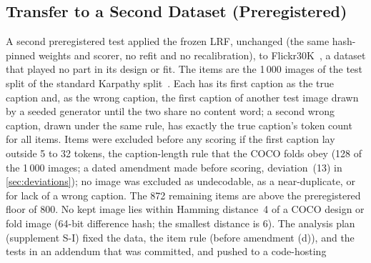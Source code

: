 \subsection{Transfer to a Second Dataset (Preregistered)}\label{sec:study2-f30k}
A second preregistered test applied the frozen LRF, unchanged (the same hash-pinned weights and scorer, no refit and no recalibration), to
Flickr30K~\cite{young2014flickr30k}, a dataset that played no part in its design or fit.
The items are the 1\,000 images of the test split of the standard Karpathy split~\cite{karpathy2015deep}.
Each has its first caption as the true caption and, as the wrong caption, the first caption of another test image drawn by a seeded
generator until the two share no content word; a second wrong caption, drawn under the same rule, has exactly the true caption's token
count for all items.
Items were excluded before any scoring if the first caption lay outside 5 to 32 tokens, the caption-length rule that the COCO folds obey
(128 of the 1\,000 images; a dated amendment made before scoring, deviation~(13) in \cref{sec:deviations}); no image was excluded as undecodable, as a near-duplicate, or for lack of a
wrong caption.
The 872 remaining items are above the preregistered floor of 800.
No kept image lies within Hamming distance~4 of a COCO design or fold image (64-bit difference hash; the smallest distance is 6).
The analysis plan (supplement S-I) fixed the data, the item rule (before amendment (d)), and the tests in an addendum that was committed, and pushed to a code-hosting
